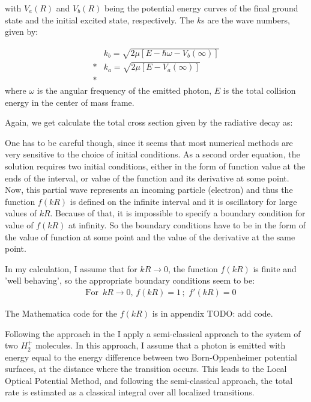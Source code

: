 with $ V_a(R) $ and $ V_b(R) $ being the potential energy curves of the final ground state and the initial excited state, respectively. The $ k $s are the wave numbers, given by:

\begin{equation}
\begin{split}
& k_b = \sqrt{2\mu\left[E - \hbar\omega - V_b(\infty)\right]} \\*
& k_a = \sqrt{2\mu\left[E - V_a(\infty)\right]} \\*
\end{split}
\end{equation}
where $ \omega$ is the angular frequency of the emitted photon, $ E $ is the total collision energy in the center of mass frame.

Again, we get calculate the total cross section given by the radiative decay as:




One has to be careful though, since it seems that most numerical methods are very sensitive to the choice of initial conditions.  As a second order equation, the solution requires two initial conditions, either in the form of function value at the ends of the interval, or value of the function and its derivative at some point. Now, this partial wave represents an incoming particle (electron) and thus the function  $  f(kR) $  is defined on the infinite interval and it is oscillatory for large values of $ kR $. Because of that, it is impossible to specify a boundary condition for value of $  f(kR) $ at infinity. So the boundary conditions have to be in the form of the value of function at some point and the value of the derivative at the same point. 

In my calculation, I assume that  for $ kR \rightarrow 0 $, the function $  f(kR) $ is finite and 'well  behaving', so the appropriate boundary conditions seem to be: 
\begin{equation}
\begin{split}
& \text{ For }\,kR \rightarrow 0,\,f(kR) = 1\,;\,\,f'(kR)  = 0
\end{split}
\end{equation}

The Mathematica code for the $  f(kR) $ is in appendix TODO: add code.

Following the approach in the \cite{ZL} I apply a semi-classical approach to the system of two $ H_2^{+} $ molecules. In this approach, I assume that a photon is emitted with energy equal to the energy difference between two Born-Oppenheimer potential surfaces, at the distance where the transition occurs. This leads to the Local Optical Potential Method, and following the semi-classical approach, the total rate is estimated as a classical integral over all localized transitions. 

